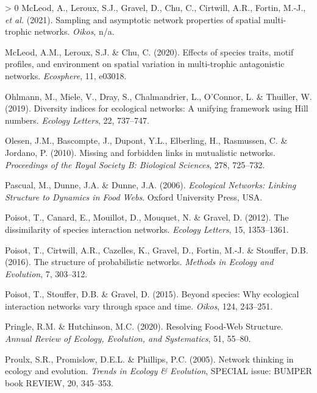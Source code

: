 \documentclass[10pt,oneside]{article}
\newlength{\cslhangindent}
\newenvironment{CSLReferences}[3] %
 {%
  \setlength{\parindent}{0pt}
  \ifodd #1 \everypar{\setlength{\hangindent}{\cslhangindent}}\ignorespaces\fi
  \ifnum #2 > 0
  \setlength{\parskip}{#2\baselineskip}
  \fi
 }%
 {}
\begin{document}
\begin{CSLReferences}{1}{0}
\leavevmode\hypertarget{ref-McLeod2021Sampling}{}%
McLeod, A., Leroux, S.J., Gravel, D., Chu, C., Cirtwill, A.R., Fortin,
M.-J., \emph{et al.} (2021). Sampling and asymptotic network properties
of spatial multi-trophic networks. \emph{Oikos}, n/a.

\leavevmode\hypertarget{ref-McLeod2020EffSpe}{}%
McLeod, A.M., Leroux, S.J. \& Chu, C. (2020). Effects of species traits,
motif profiles, and environment on spatial variation in multi-trophic
antagonistic networks. \emph{Ecosphere}, 11, e03018.

\leavevmode\hypertarget{ref-Ohlmann2019Diversity}{}%
Ohlmann, M., Miele, V., Dray, S., Chalmandrier, L., O'Connor, L. \&
Thuiller, W. (2019). Diversity indices for ecological networks: A
unifying framework using Hill numbers. \emph{Ecology Letters}, 22,
737--747.

\leavevmode\hypertarget{ref-Olesen2010Missing}{}%
Olesen, J.M., Bascompte, J., Dupont, Y.L., Elberling, H., Rasmussen, C.
\& Jordano, P. (2010). Missing and forbidden links in mutualistic
networks. \emph{Proceedings of the Royal Society B: Biological
Sciences}, 278, 725--732.

\leavevmode\hypertarget{ref-Pascual2006Ecologicala}{}%
Pascual, M., Dunne, J.A. \& Dunne, J.A. (2006). \emph{Ecological
Networks: Linking Structure to Dynamics in Food Webs}. Oxford University
Press, USA.

\leavevmode\hypertarget{ref-Poisot2012Dissimilaritya}{}%
Poisot, T., Canard, E., Mouillot, D., Mouquet, N. \& Gravel, D. (2012).
The dissimilarity of species interaction networks. \emph{Ecology
Letters}, 15, 1353--1361.

\leavevmode\hypertarget{ref-Poisot2016Structure}{}%
Poisot, T., Cirtwill, A.R., Cazelles, K., Gravel, D., Fortin, M.-J. \&
Stouffer, D.B. (2016). The structure of probabilistic networks.
\emph{Methods in Ecology and Evolution}, 7, 303--312.

\leavevmode\hypertarget{ref-Poisot2015Speciesa}{}%
Poisot, T., Stouffer, D.B. \& Gravel, D. (2015). Beyond species: Why
ecological interaction networks vary through space and time.
\emph{Oikos}, 124, 243--251.

\leavevmode\hypertarget{ref-Pringle2020Resolving}{}%
Pringle, R.M. \& Hutchinson, M.C. (2020). Resolving Food-Web Structure.
\emph{Annual Review of Ecology, Evolution, and Systematics}, 51, 55--80.

\leavevmode\hypertarget{ref-Proulx2005Networka}{}%
Proulx, S.R., Promislow, D.E.L. \& Phillips, P.C. (2005). Network
thinking in ecology and evolution. \emph{Trends in Ecology \&
Evolution}, SPECIAL issue: BUMPER book REVIEW, 20, 345--353.


\end{CSLReferences}
\end{document}

